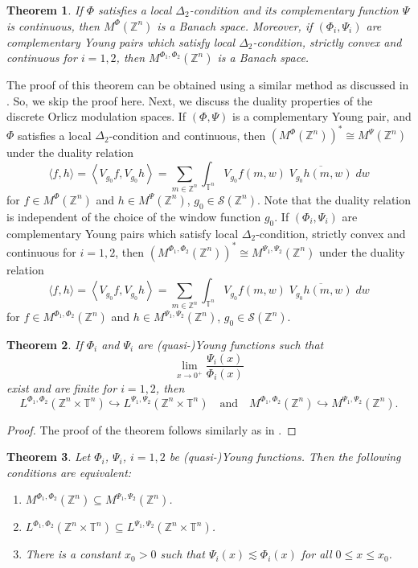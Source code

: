 \documentclass[a4paper,11pt, reqno]{amsart}
\theoremstyle{plain}
\newtheorem{theorem}{Theorem}[section]
\theoremstyle{definition}
\theoremstyle{remark}
\def \Z{{\mathbb Z}}
\def \T{{\mathbb T}}
\begin{document}
\begin{theorem}\label{th5}
If $\Phi$ satisfies a local $\Delta_2$-condition and its complementary function $\Psi$ is continuous, then $M^{\Phi}(\Z^n)$ is a Banach space. Moreover, if $\left(\Phi_i, \Psi_i \right)$ are complementary Young pairs which satisfy local $\Delta_2$-condition, strictly convex and continuous for $i = 1, 2$, then $M^{\Phi_1, \Phi_2}(\Z^n)$ is a Banach space.
\end{theorem} 
The proof of this theorem can be obtained using a similar method as discussed in \cite{sch13}. So, we skip the proof here. Next, we discuss the duality properties of the discrete Orlicz modulation spaces. If $\left(\Phi, \Psi \right)$ is a complementary Young pair, and $\Phi$ satisfies a local $\Delta_2$-condition and continuous, then $(M^{\Phi}(\Z^n))^* \cong M^{\Psi}(\Z^n)$ under the duality relation
\[ \langle f,h \rangle = \left\langle V_{g_0} f, V_{g_0} h \right\rangle = \sum_{m \in \Z^n} \int_{\T^n} V_{g_0} f(m,w) \; \overline{V_{g_0} h(m,w)} \; dw \] 
for $f \in M^{\Phi}(\Z^n)$ and $h \in M^{\Psi}(\Z^n)$, $g_0 \in \mathcal{S}(\Z^n)$. Note that the duality relation is independent of the choice of the window function $g_0$. If $\left(\Phi_i, \Psi_i \right)$ are complementary Young pairs which satisfy local $\Delta_2$-condition, strictly convex and continuous for $i = 1, 2$, then $(M^{\Phi_1, \Phi_2}(\Z^n))^* \cong M^{\Psi_1, \Psi_2}(\Z^n)$ under the duality relation
\[ \langle f,h \rangle = \left\langle V_{g_0} f, V_{g_0} h \right\rangle = \sum_{m \in \Z^n} \int_{\T^n} V_{g_0} f(m,w) \; \overline{V_{g_0} h(m,w)} \; dw \]   
for $f \in M^{\Phi_1, \Phi_2}(\Z^n)$ and $h \in M^{\Psi_1, \Psi_2}(\Z^n)$, $g_0 \in \mathcal{S}(\Z^n)$.
\begin{theorem}\label{th6}
If $\Phi_i$ and $ \Psi_i$ are (quasi-)Young functions such that 
\[ \lim_{x \to 0^+} \frac{\Psi_i(x)}{\Phi_i(x)} \]
exist and are finite for $i = 1, 2$, then
\begin{equation}\label{eq3}
L^{\Phi_1, \Phi_2} (\Z^n \times \T^n) \hookrightarrow  L^{\Psi_1, \Psi_2} (\Z^n \times \T^n) \quad \text{and} \quad M^{\Phi_1, \Phi_2}(\Z^n) \hookrightarrow M^{\Psi_1, \Psi_2}(\Z^n).
\end{equation}
\end{theorem}
\begin{proof}
The proof of the theorem follows similarly as in \cite[Theorem 5.10]{tof22}.
\end{proof}   
\begin{theorem}\label{th7}
Let $\Phi_i$, $ \Psi_i$, $i = 1, 2$ be (quasi-)Young functions. Then the following conditions are equivalent:
\begin{enumerate}
\item $M^{\Phi_1, \Phi_2}(\Z^n) \subseteq M^{\Psi_1, \Psi_2}(\Z^n)$.

\item $ L^{\Phi_1, \Phi_2} (\Z^n \times \T^n) \subseteq  L^{\Psi_1, \Psi_2} (\Z^n \times \T^n) $.

\item There is a constant $x_0 > 0$ such that $\Psi_i(x) \lesssim \Phi_i(x)$ for all $0 \leq x \leq x_0$.
\end{enumerate}
\end{theorem}
\end{document}
